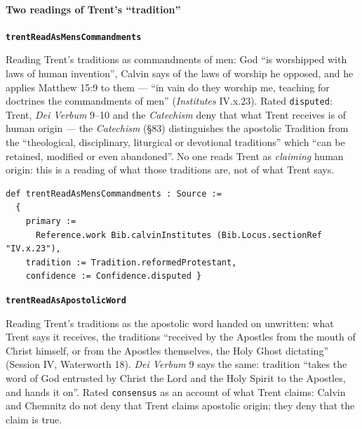 \documentclass[11pt]{article}
\begin{document}
\paragraph*{Two readings of Trent’s “tradition”}
\leavevmode\par\nobreak
\par\medskip\noindent\textbf{\texttt{trent\allowbreak{}Read\allowbreak{}As\allowbreak{}Mens\allowbreak{}Commandments}}\par\nobreak\noindent
Reading Trent’s traditions as commandments of men: God “is worshipped with laws of human invention”, Calvin says of the laws of worship he opposed, and he applies Matthew 15:9 to them — “in vain do they worship me, teaching for doctrines the commandments of men” (\emph{Institutes} IV.x.23). Rated \texttt{disputed}: Trent, \emph{Dei Verbum} 9–10 and the \emph{Catechism} deny that what Trent receives is of human origin — the \emph{Catechism} (§83) distinguishes the apostolic Tradition from the “theological, disciplinary, liturgical or devotional traditions” which “can be retained, modified or even abandoned”. No one reads Trent as \emph{claiming} human origin: this is a reading of what those traditions are, not of what Trent says.

{\small\begin{verbatim}
def trentReadAsMensCommandments : Source :=
  {
    primary :=
      Reference.work Bib.calvinInstitutes (Bib.Locus.sectionRef "IV.x.23"),
    tradition := Tradition.reformedProtestant,
    confidence := Confidence.disputed }
\end{verbatim}}
\par\medskip\noindent\textbf{\texttt{trent\allowbreak{}Read\allowbreak{}As\allowbreak{}Apostolic\allowbreak{}Word}}\par\nobreak\noindent
Reading Trent’s traditions as the apostolic word handed on unwritten: what Trent says it receives, the traditions “received by the Apostles from the mouth of Christ himself, or from the Apostles themselves, the Holy Ghost dictating” (Session IV, Waterworth 18). \emph{Dei Verbum} 9 says the same: tradition “takes the word of God entrusted by Christ the Lord and the Holy Spirit to the Apostles, and hands it on”. Rated \texttt{consensus} as an account of what Trent claims: Calvin and Chemnitz do not deny that Trent claims apostolic origin; they deny that the claim is true.
\end{document}
